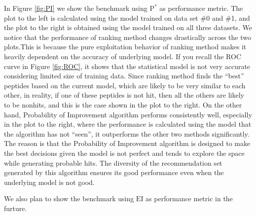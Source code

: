 \documentclass[12pt]{article}
\newcommand{\EI}{\mathrm{EI}}
\newcommand{\PI}{\text{P}^*}
\begin{document}
In Figure \ref{fig:PI} we show the benchmark using $\PI$ as performance metric. The plot to the left is calculated using the model trained on data set \#0 and \#1, and the plot to the right is obtained using the model trained on all three datasets. We notice that the performance of ranking method changes drastically across the two plots.This is because the pure exploitation behavior of ranking method makes it heavily dependent on the accuracy of underlying model. If you recall the ROC curve in Figure \ref{fig:ROC}, it shows that the statistical model is not very accurate considering limited size of training data. Since ranking method finds the ``best'' peptides based on the current model, which are  likely to be very similar to each other, in reality, if one of these peptides is not hit, then all the others are likely to be nonhits, and this is the case shown in the plot to the right. On the other hand, Probability of Improvement algorithm performs consistently well, especially in the plot to the right, where the performance is calculated using the model that the algorithm has not ``seen'', it outperforms the other two methods significantly. The reason is that the Probability of Improvement algorithm is designed to make the best decisions given the model is not perfect and tends to explore the space while generating probable hits. The diversity of the recommendation set generated by this algorithm ensures its good performance even when the underlying model is not good.

We also plan to show the benchmark using $\EI$ as performance metric in the furture.

\end{document}
